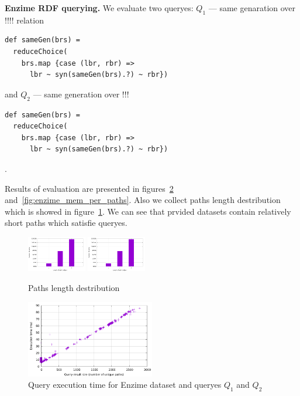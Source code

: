 \textbf{Enzime RDF querying.} We evaluate two queryes: $Q_1$ --- same genaration over !!!! relation
\begin{lstlisting}
def sameGen(brs) =
  reduceChoice(
    brs.map {case (lbr, rbr) =>
      lbr ~ syn(sameGen(brs).?) ~ rbr})
\end{lstlisting}

and $Q_2$ --- same generation over !!!
\begin{lstlisting}
def sameGen(brs) =
  reduceChoice(
    brs.map {case (lbr, rbr) =>
      lbr ~ syn(sameGen(brs).?) ~ rbr})
\end{lstlisting}
.

Results of evaluation are presented in figures~\ref{fig:enzime_time_per_paths} and~\ref{fig:enzime_mem_per_paths}.
Also we collect paths length destribution which is showed in figure~\ref{fig:pLength}.
We can see that prvided datasets contain relatively short paths which satisfie queryes.


\begin{figure}
\centering
    {\includegraphics[width=0.23\textwidth]{data/enzime_narrowerTr_path_per_length.pdf}}
{\includegraphics[width=0.23\textwidth]{data/enzime_narrowerTr_path_per_length.pdf}}
\caption{Paths length destribution}\label{fig:pLength}
\end{figure}

\begin{figure}[ht]
  \begin{center}
    \includegraphics[width=0.5\textwidth]{data/enzime_narrowerTr_time_per_paths.pdf}
    \caption{Query execution time for Enzime dataset and queryes $Q_1$ and $Q_2$}
    \label{fig:enzime_time_per_paths}
  \end{center}
\end{figure}

